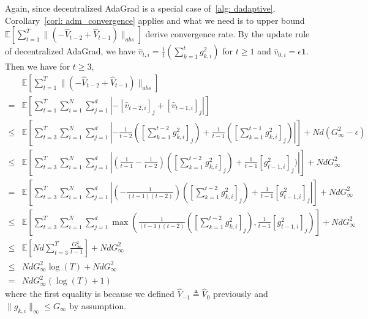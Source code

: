 \documentclass[11pt]{article}
\begin{document}
Again, since decentralized AdaGrad is a special case of~\ref{alg: dadaptive}, Corollary~\ref{corl: adm_convergence} applies and what we need is to upper bound  $\mathbb E \left[ \sum_{t=1}^{T}   \|    (- \hat V_{t-2} + \hat V_{t-1} ) \|_{abs} \right]  $  derive convergence rate.  By the update rule of decentralized AdaGrad, we have $\hat v_{t,i} = \frac{1}{t}( \sum_{k=1}^{t}g_{k,i}^2)$ for $t \geq 1$ and $\hat v_{0,i} = \epsilon \mathbf 1$. Then we have for $t \geq 3$,
\begin{align}
&\mathbb E \left[ \sum_{t=1}^{T}   \|    (- \hat V_{t-2} + \hat V_{t-1} ) \|_{abs} \right]  \nonumber \\
= &\mathbb E \left[ \sum_{t=1}^{T}  \sum_{i=1}^N \sum_{j=1}^d    |- [\hat v_{t-2,i}]_j + [\hat v_{t-1,i}]_j | \right] \nonumber   \\
\leq &\mathbb E \left[ \sum_{t=3}^{T}  \sum_{i=1}^N \sum_{j=1}^d    |- \frac{1}{t-2}( [\sum_{k=1}^{t-2}g_{k,i}^2]_j) + \frac{1}{t-1}([ \sum_{k=1}^{t-1}g_{k,i}^2]_j )| \right] + Nd (G_{\infty}^2 - \epsilon) \nonumber \\
\leq &\mathbb E \left[ \sum_{t=3}^{T}  \sum_{i=1}^N \sum_{j=1}^d    | (\frac{1}{t-1} - \frac{1}{t-2})( [\sum_{k=1}^{t-2}g_{k,i}^2]_j) + \frac{1}{t-1} [g_{t-1,i}^2]_j )| \right] +  Nd G_{\infty}^2  \nonumber  \\
=  &\mathbb E \left[ \sum_{t=3}^{T}  \sum_{i=1}^N \sum_{j=1}^d    | (-\frac{1}{(t-1)(t-2)} )( [\sum_{k=1}^{t-2}g_{k,i}^2]_j) + \frac{1}{t-1}[g_{t-1,i}^2]_j | \right]    +  Nd G_{\infty}^2  \nonumber \\
\leq &\mathbb E \left[ \sum_{t=3}^{T}  \sum_{i=1}^N \sum_{j=1}^d    \max\left( \frac{1}{(t-1)(t-2)} ( [\sum_{k=1}^{t-2}g_{k,i}^2]_j) , \frac{1}{t-1}[g_{t-1,i}^2]_j \right) \right]    +  Nd G_{\infty}^2 \nonumber  \\
\leq  &\mathbb E \left[ N d \sum_{t=3}^{T}      \frac{G_{\infty}^2}{t-1}   \right]   +  Nd G_{\infty}^2 \nonumber  \\
\leq & Nd G_{\infty}^2 \log (T) +  Nd G_{\infty}^2 \nonumber \\
= & NdG_{\infty}^2 (\log (T) + 1) \nonumber
\end{align}
where the first equality is because  we defined $\hat V_{-1} \triangleq \hat V_0$  previously and $\|g_{k,i}\|_{\infty} \leq G_{\infty}$ by assumption.
\end{document}
